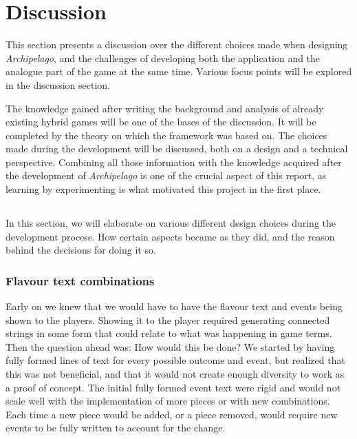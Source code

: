 \chapter{Discussion}
\label{sec:disc}
This section presents a discussion over the different choices made when designing \textit{Archipelago}, and the challenges of developing both the application and the analogue part of the game at the same time. Various focus points will be explored in the discussion section. 

The knowledge gained after writing the background and analysis of already existing hybrid games will be one of the bases of the discussion. It will be completed by the theory on which the framework was based on. The choices made during the development will be discussed, both on a design and a technical perspective. Combining all those information with the knowledge acquired after the development of \textit{Archipelago} is one of the crucial aspect of this report, as learning by experimenting is what motivated this project in the first place.

\section{} 
In this section, we will elaborate on various different design choices during the development process. How certain aspects became as they did, and the reason behind the decisions for doing it so.

\subsection{Flavour text combinations}
Early on we knew that we would have to have the flavour text and events being shown to the players. Showing it to the player required generating connected strings in some form that could relate to what was happening in game terms.
Then the question ahead was: How would this be done?
We started by having fully formed lines of text for every possible outcome and event, but realized that this was not beneficial, and that it would not create enough diversity to work as a proof of concept. 
The initial fully formed event text were rigid and would not scale well with the implementation of more pieces or with new combinations. Each time a new piece would be added, or a piece removed, would require new events to be fully written to account for the change. 

